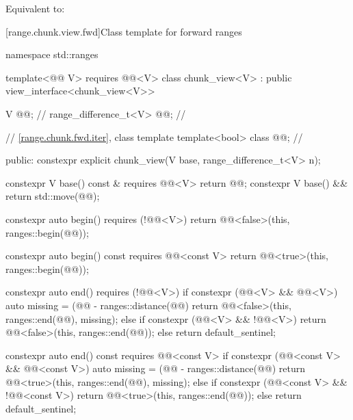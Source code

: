 \begin{itemdescr}
\pnum
\effects
Equivalent to: 
\end{itemdescr}

[range.chunk.view.fwd]{Class template  for forward ranges}

%
%
%
\begin{codeblock}
namespace std::ranges {
  template<@@ V>
    requires @@<V>
  class chunk_view<V> : public view_interface<chunk_view<V>> {
    V @@;                            // \expos
    range_difference_t<V> @@;           // \expos

    // \ref{range.chunk.fwd.iter}, class template 
    template<bool> class @@;      // \expos

  public:
    constexpr explicit chunk_view(V base, range_difference_t<V> n);

    constexpr V base() const & requires @@<V> { return @@; }
    constexpr V base() && { return std::move(@@); }

    constexpr auto begin() requires (!@@<V>) {
      return @@<false>(this, ranges::begin(@@));
    }

    constexpr auto begin() const requires @@<const V> {
      return @@<true>(this, ranges::begin(@@));
    }

    constexpr auto end() requires (!@@<V>) {
      if constexpr (@@<V> && @@<V>) {
        auto missing = (@@ - ranges::distance(@@) %
        return @@<false>(this, ranges::end(@@), missing);
      } else if constexpr (@@<V> && !@@<V>) {
        return @@<false>(this, ranges::end(@@));
      } else {
        return default_sentinel;
      }
    }

    constexpr auto end() const requires @@<const V> {
      if constexpr (@@<const V> && @@<const V>) {
        auto missing = (@@ - ranges::distance(@@) %
        return @@<true>(this, ranges::end(@@), missing);
      } else if constexpr (@@<const V> && !@@<const V>) {
        return @@<true>(this, ranges::end(@@));
      } else {
        return default_sentinel;
      }
    }

}}
\end{codeblock}
